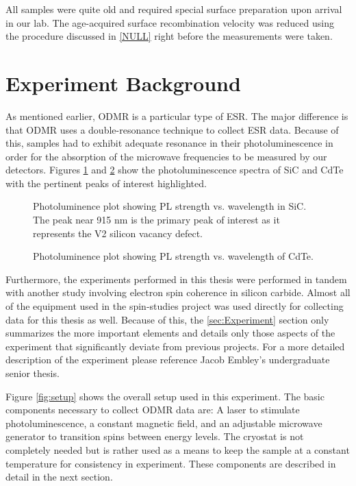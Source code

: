 \documentclass[oneside, astronomy, noacknowlegments]{BYUPhys}
\begin{document}
All samples were quite old and required special surface preparation upon arrival in our lab. The age-acquired surface recombination velocity was reduced using the procedure discussed in \ref{NULL} right before the measurements were taken.

\section{Experiment Background}

As mentioned earlier, ODMR is a particular type of ESR. The major difference is that ODMR uses a double-resonance technique to collect ESR data. Because of this, samples had to exhibit adequate resonance in their photoluminescence in order for the absorption of the microwave frequencies to be measured by our detectors. Figures \ref{fig:SiCPL} and \ref{fig:CdTePL} show the photoluminescence spectra of SiC and CdTe with the pertinent peaks of interest highlighted.

\begin{figure}
    \caption[Photoluminence Spectra of Silicon Carbide]{\label{fig:SiCPL}
      Photoluminence plot showing PL strength vs. wavelength in SiC. The peak near 915 nm is the primary peak of interest as it represents the V2 silicon vacancy defect.}
 \end{figure}
 
\begin{figure}
    \caption[Photoluminence Spectra of Cadmium Telluride]{\label{fig:CdTePL}
     Photoluminence plot showing PL strength vs. wavelength of CdTe.}
 \end{figure}

Furthermore, the experiments performed in this thesis were performed in tandem with another study involving electron spin coherence in silicon carbide. Almost all of the equipment used in the spin-studies project was used directly for collecting data for this thesis as well. Because of this, the \ref{sec:Experiment} section only summarizes the more important elements and details only those aspects of the experiment that significantly deviate from previous projects. For a more detailed description of the experiment please reference Jacob Embley's undergraduate senior thesis.

Figure \ref{fig:setup} shows the overall setup used in this experiment. The basic components necessary to collect ODMR data are: A laser to stimulate photoluminescence, a constant magnetic field, and an adjustable microwave generator to transition spins between energy levels. The cryostat is not completely needed but is rather used as a means to keep the sample at a constant temperature for consistency in experiment. These components are described in detail in the next section.
\end{document}
